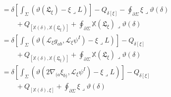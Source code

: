 \[
	\begin{aligned}
		 & =
		\delta
		\left[
			\int_{\Sigma}
			\left(
			\vartheta(\mathfrak{L}_{\xi})
			-
			\xi\mathbin{\lrcorner}L
			\right)
			\right]
		-
		Q_{\delta[\xi]}
		-
		\oint_{\partial\Sigma}
		\xi\mathbin{\lrcorner}\vartheta(\delta)
		\\
		 & \qquad
		+
		Q_{[\mathbb{X}(\delta),\mathbb{X}(\mathfrak{L}_{\xi})]}
		+
		\oint_{\partial\Sigma}
		\mathbb{X}(\mathfrak{L}_{\xi})
		\mathbin{\lrcorner}
		\vartheta(\delta)
		\\[2ex]
		 & =
		\delta
		\left[
			\int_{\Sigma}
			\left(
			\vartheta(
			\mathcal{L}_{\xi}g_{ab},
			\mathcal{L}_{\xi}\psi^{I}
			)
			-
			\xi\mathbin{\lrcorner}L
			\right)
			\right]
		-
		Q_{\delta[\xi]}
		\\
		 & \qquad
		+
		Q_{[\mathbb{X}(\delta),\mathbb{X}(\mathfrak{L}_{\xi})]}
		+
		\oint_{\partial\Sigma}
		\mathbb{X}(\mathfrak{L}_{\xi})
		\mathbin{\lrcorner}
		\vartheta(\delta)
		\\[2ex]
		 & =
		\delta
		\left[
			\int_{\Sigma}
			\left(
			\vartheta(
			2\nabla_{(a}\xi_{b)},
			\mathcal{L}_{\xi}\psi^{I}
			)
			-
			\xi\mathbin{\lrcorner}L
			\right)
			\right]
		-
		Q_{\delta[\xi]}
		\\
		 & \qquad
		+
		Q_{[\mathbb{X}(\delta),\xi]}
		+
		\oint_{\partial\Sigma}
		\xi\mathbin{\lrcorner}\vartheta(\delta)
		\\[2ex]
	\end{aligned}
\]
